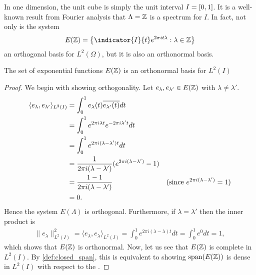 \documentclass[../thesis.tex]{subfiles}
\begin{document}
In one dimension, the unit cube is simply the unit interval $I=[0,1]$. It is a well-known result from Fourier analysis that $\Lambda = \mathbb{Z}$ is a spectrum for $I$. In fact, not only is the system
\begin{equation*}
    E(\Z) = \braqMed{\indicator{I}{t} e^{2\pi i t \lambda} : \lambda \in \Z}
\end{equation*} 
an orthogonal basis for $L^2(\Omega)$, but it is also an orthonormal basis.
\begin{lemma}\label{lem:exp_onb_onedim}
    The set of exponential functions $E(\mathbb{Z})$ is an orthonormal basis for $L^2(I)$
\end{lemma}
\begin{proof}
    We begin with showing orthogonality. Let $e_{\lambda}, e_{\lambda'} \in E(\mathbb{Z})$ with $\lambda \neq \lambda'$. %
    \begin{align}\label{eq:orthog_one_dim_req}
        \langle e_{\lambda},e_{\lambda'} \rangle_{L^2(I)} &= \int_0^1 e_{\lambda}(t)\overline{e_{\lambda'}(t)} dt \nonumber\\ 
        &= \int_0^1 e^{2 \pi i {\lambda}t} e^{-2 \pi i {\lambda'}t} dt \nonumber\\
        &= \int_0^1 e^{2 \pi i (\lambda-\lambda')t} dt \nonumber\\
        &=\frac{1}{2 \pi i (\lambda-\lambda')} (e^{2 \pi i (\lambda - \lambda')} -1) \\
        &=\frac{1-1}{2 \pi i (\lambda-\lambda')} & (\text{since } e^{2 \pi i (\lambda-\lambda')} = 1) \nonumber\\
        &= 0 \nonumber.
    \end{align}
    Hence the system $E(\Lambda)$ is orthogonal. Furthermore, if $\lambda =\lambda'$ then the inner product is
    \begin{align*}\label{eq:exp_norm_one}
        \| e_\lambda \|^2_{L^2(I)} 
        = \langle e_{\lambda},e_{\lambda} \rangle_{L^2(I)} 
        = \int_0^1 e^{2 \pi i (\lambda-\lambda)t} dt
        = \int_0^1 e^{0} dt = 1,
    \end{align*}
    which shows that $E(\mathbb{Z})$ is orthonormal. Now, let us see that $E(\mathbb{Z})$ is complete in $L^2(I)$. By \cref{def:closed_span}, this is equivalent to showing $\operatorname{span}(E(\mathbb{Z}))$ is dense in $L^2(I)$ with respect to the \Ltwonorm. 

\end{proof}
\end{document}
